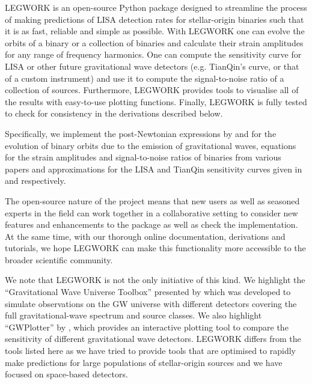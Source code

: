 \documentclass[twocolumn]{aastex631}
\newcommand{\lw}{LEGWORK}
\begin{document}
\lw{} is an open-source Python package designed to streamline the process of making predictions of LISA detection rates for stellar-origin binaries such that it is as fast, reliable and simple as possible. With \lw{} one can evolve the orbits of a binary or a collection of binaries and calculate their strain amplitudes for any range of frequency harmonics. One can compute the sensitivity curve for LISA or other future gravitational wave detectors (e.g. TianQin's curve, or that of a custom instrument) and use it to compute the signal-to-noise ratio of a collection of sources. Furthermore, \lw{} provides tools to visualise all of the results with easy-to-use plotting functions. Finally, \lw{} is fully tested to check for consistency in the derivations described below.

Specifically, we implement the post-Newtonian expressions by \citet{Peters+1963} and \citet{Peters+1964} for the evolution of binary orbits due to the emission of gravitational waves, equations for the strain amplitudes and signal-to-noise ratios of binaries from various papers \citep[e.g.][]{Flanagan+1998, Finn+2000, Cornish2003, Barack+2004, Moore+2015} and approximations for the LISA and TianQin sensitivity curves given in \citet{Robson+2019} and \citet{Huang+2020} respectively.

The open-source nature of the project means that new users as well as seasoned experts in the field can work together in a collaborative setting to consider new features and enhancements to the package as well as check the implementation. At the same time, with our thorough online documentation, derivations and tutorials, we hope \lw{} can make this functionality more accessible to the broader scientific community.

We note that \lw{} is not the only initiative of this kind. We highlight the ``Gravitational Wave Universe Toolbox'' presented by \citet{Yi2021} which was developed to simulate observations on the GW universe with different detectors covering the full gravitational-wave spectrum and source classes. We also highlight ``GWPlotter'' by \citep{Moore+2015}, which provides an interactive plotting tool to compare the sensitivity of different gravitational wave detectors. \lw{} differs from the tools listed here as we have tried to provide tools that are optimised to rapidly make predictions for large populations of stellar-origin sources and we have focused on space-based detectors.
\end{document}

